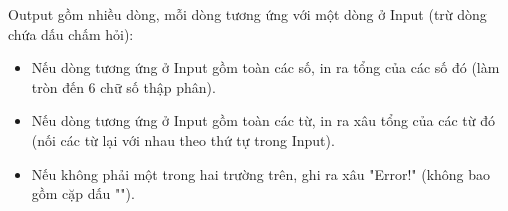 Output gồm nhiều dòng, mỗi dòng tương ứng với một dòng ở Input (trừ dòng chứa dấu chấm hỏi):  
\begin{itemize}
	\item     Nếu dòng tương ứng ở Input gồm toàn các số, in ra tổng của các số đó (làm tròn đến 6 chữ số thập phân).   
	\item     Nếu dòng tương ứng ở Input gồm toàn các từ, in ra xâu tổng của các từ đó (nối các từ lại với nhau theo thứ tự trong Input).   
	\item     Nếu không phải một trong hai trường trên, ghi ra xâu "Error!" (không bao gồm cặp dấu "").   
\end{itemize}
